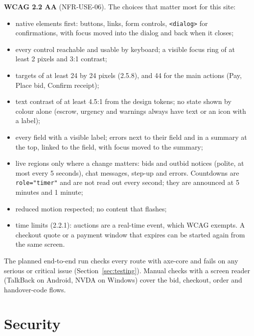 \documentclass[11pt,a4paper]{article}
\begin{document}
\textbf{WCAG 2.2 AA} (NFR-USE-06). The choices that matter most for this site:
\begin{itemize}[nosep]
  \item native elements first: buttons, links, form controls, \texttt{<dialog>} for confirmations, with focus moved into the dialog and back when it closes;
  \item every control reachable and usable by keyboard; a visible focus ring of at least 2 pixels and 3:1 contrast;
  \item targets of at least 24 by 24 pixels (2.5.8), and 44 for the main actions (Pay, Place bid, Confirm receipt);
  \item text contrast of at least 4.5:1 from the design tokens; no state shown by colour alone (escrow, urgency and warnings always have text or an icon with a label);
  \item every field with a visible label; errors next to their field and in a summary at the top, linked to the field, with focus moved to the summary;
  \item live regions only where a change matters: bids and outbid notices (polite, at most every 5 seconds), chat messages, step-up and errors. Countdowns are \texttt{role="timer"} and are not read out every second; they are announced at 5 minutes and 1 minute;
  \item reduced motion respected; no content that flashes;
  \item time limits (2.2.1): auctions are a real-time event, which WCAG exempts. A checkout quote or a payment window that expires can be started again from the same screen.
\end{itemize}
The planned end-to-end run checks every route with axe-core and fails on any serious or critical issue (Section~\ref{sec:testing}). Manual checks with a screen reader (TalkBack on Android, NVDA on Windows) cover the bid, checkout, order and handover-code flows.

\section{Security}
\label{sec:security}
\end{document}
